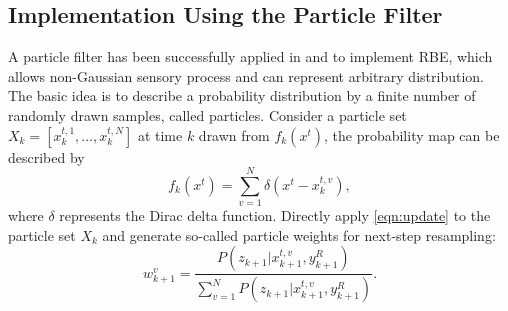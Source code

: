 \documentclass[twocolumn,10pt]{asme2e}
\begin{document}
\subsection*{Implementation Using the Particle Filter}
A particle filter has been successfully applied in \cite{ryan2010particle} and \cite{hoffmann2010mobile} to implement RBE, which allows non-Gaussian sensory process and can represent arbitrary distribution.
The basic idea is to describe a probability distribution by a finite number of randomly drawn samples, called particles.
Consider a particle set $X_k=[x_k^{t,1},\dots,x_k^{t,N}]$ at time $k$ drawn from $f_k(x^t)$, the probability map can be described by
\begin{equation}\label{eqn:prob_map_pf}
f_k(x^t)=\sum\limits^N_{v=1} \delta(x^t-x^{t,v}_k),
\end{equation}
where $\delta$ represents the Dirac delta function.
Directly apply \cref{eqn:update} to the particle set $X_k$ and generate so-called particle weights for next-step resampling:
\begin{equation}\label{eqn:pf_w}
w^v_{k+1}=\frac{P(z_{k+1}|x^{t,v}_{k+1},y^R_{k+1})}{\sum\limits^N_{v=1}P(z_{k+1}|x^{t,v}_{k+1},y^R_{k+1})}.
\end{equation}
\end{document}
